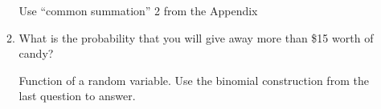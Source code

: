 \documentclass[11pt]{article}
\begin{document}
\begin{enumerate}
\begin{enumerate}
                {\color{red} Use ``common summation'' 2 from the Appendix}
            \item What is the probability that you will give away more than \$15 worth of candy?

                {\color{red} Function of a random variable. Use the binomial construction from the last question to answer.}
        \end{enumerate}
\end{enumerate}
\end{document}
